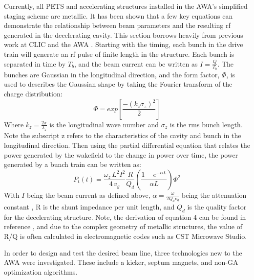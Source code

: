 \documentclass{iitthesis}
\begin{document}
Currently, all PETS and accelerating structures installed in the AWA's
simplified staging scheme are metallic. It has been shown that a few
key equations can demonstrate the relationship between beam parameters
and the resulting rf generated in the decelerating cavity. This section
borrows heavily from previous work at CLIC and the AWA \cite{key-3,key-8}. 
Starting with the timing, each bunch in the drive train will generate
an rf pulse of finite length in the structure. Each bunch is separated
in time by $T_{b}$, and the beam current can be written as $I=\frac{Q}{T_{b}}$.
The bunches are Gaussian in the longitudinal direction, and the form
factor, $\Phi$, is used to describes the Gaussian shape by taking
the Fourier transform of the charge distribution: 
\begin{equation}
\Phi=exp\left[\frac{-(k_{z}\sigma_{z})^{2}}{2}\right]
\end{equation}
Where $k_{z}=\frac{2\pi}{\lambda_{z}}$ is the longitudinal wave number
and $\sigma_{z}$ is the rms bunch length. Note the subscript z refers
to the characteristics of the cavity and bunch in the longitudinal
direction. Then using the partial differential equation that relates
the power generated by the wakefield to the change in power over time,
the power generated by a bunch train can be written as:
\begin{equation} \label{eq:rfpower}
P_{t}(t)=\frac{\omega_{z}\,L^{2}I^{2}}{4\,v_{g}}\frac{R}{Q_{d}}\left(\frac{1-e^{-\alpha L}}{\alpha L}\right)\Phi^{2}
\end{equation}
With $I$ being the beam current as defined above, $\alpha=\frac{\omega}{2Q_{d}v_{g}}$
being the attenuation constant \cite{key-9}, R is the shunt impedance
per unit length, and $Q_{d}$ is the quality factor for the decelerating
structure. Note, the derivation of equation 4 can be found in reference
\cite{key-8}, and due to the complex geometry of metallic structures,
the value of R/Q is often calculated in electromagnetic codes such
as CST Microwave Studio. 





 \label{sec:requirements}

In order to design and test the desired beam line, three technologies 
new to the AWA were investigated. These include a kicker, septum magnets, 
and non-GA optimization algorithms.
\end{document}
